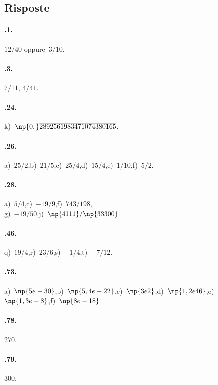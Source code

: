 \subsection{Risposte}
\begin{multicols}{2}
\paragraph{\thechapter.1.}$12/40$ oppure~$3/10$.

\paragraph{\thechapter.3.} $7/11$, $4/41$.

\paragraph{\thechapter.24.} k)~$\np{0,}\overline{2892561983471074380165}$.

\paragraph{\thechapter.26.} a)~$25/2$,\quad b)~$21/5$,\quad c)~$25/4$,\quad d)~$15/4$,\quad e)~$1/10$,\quad f)~$5/2$.

\paragraph{\thechapter.28.} a)~$5/4$,\quad c)~$-19/9$,\quad f)~$743/198$,\protect\\g)~$-19/50$,\quad j)~$\np{4111}/\np{33300}$.

\paragraph{\thechapter.46.} q)~$19/4$,\quad r)~$23/6$,\quad s)~$-1/4$,\quad t)~$-7/12$.

\paragraph{\thechapter.73.} a)~$\np{5e-30}$,\quad b)~$\np{5,4e-22}$,\quad c)~$\np{3e2}$,\quad d)~$\np{1,2e46}$,\quad e)~$\np{1,3e-8}$,\quad f)~$\np{8e-18}$.

\paragraph{\thechapter.78.} 270.

\paragraph{\thechapter.79.} 300.


\end{multicols}

